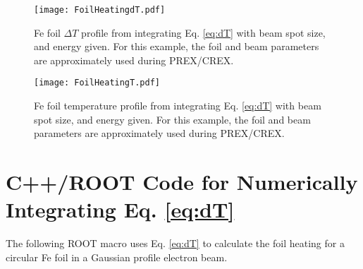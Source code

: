 \documentclass[12pt]{article}
\begin{document}
\begin{figure}[h]
\centering
\texttt{[image: FoilHeatingdT.pdf]}
\caption{\label{fig:foilheating}Fe foil $\Delta T$ profile from integrating Eq. \ref{eq:dT} with beam spot size, and energy given. For this example, the foil and beam parameters are approximately used during PREX/CREX.}
\end{figure}
\begin{figure}[h]
\centering
\texttt{[image: FoilHeatingT.pdf]}
\caption{\label{fig:foilheatingT}Fe foil temperature profile from integrating Eq. \ref{eq:dT} with beam spot size, and energy given. For this example, the foil and beam parameters are approximately used during PREX/CREX.}
\end{figure}
\clearpage
\section{C++/ROOT Code for Numerically Integrating Eq. \ref{eq:dT}}
The following ROOT macro uses Eq. \ref{eq:dT} to calculate the foil heating for a circular Fe foil in a Gaussian profile electron beam.
\end{document}
